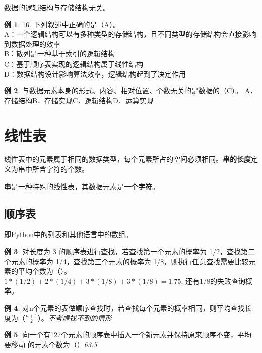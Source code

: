 \documentclass[hyperref,a4paper,UTF8,12pt]{ctexart}
\theoremstyle{definition}
\newtheorem{example}{例}[section]
\begin{document}
数据的逻辑结构与存储结构无关。
\begin{example}
    16. 下列叙述中正确的是（A）。\\
A：一个逻辑结构可以有多种类型的存储结构，且不同类型的存储结构会直接影响到数据处理的效率\\
B：散列是一种基于索引的逻辑结构\\
C：基于顺序表实现的逻辑结构属于线性结构\\
D：数据结构设计影响算法效率，逻辑结构起到了决定作用
\end{example}
\begin{example}
    与数据元素本身的形式、内容、相对位置、个数无关的是数据的（C）。
A．存储结构\quad B．存储实现\quad C．逻辑结构\quad D．运算实现
\end{example}

\section{线性表}
线性表中的元素属于相同的数据类型，每个元素所占的空间必须相同。\textbf{串的长度}定义为串中所含字符的个数。

\textbf{串}是一种特殊的线性表，其数据元素是\textbf{一个字符}。

\subsection{顺序表}
即Python中的列表和其他语言中的数组。
\begin{example}
    对长度为 3 的顺序表进行查找，若查找第一个元素的概率为 1/2，查找第二个元素的概率为 1/4，查找第三个元素的概率为 1/8，则执行任意查找需要比较元素的平均个数为（\quad）。\\
$1*(1/2) + 2*(1/4) + 3*(1/8) + 3*(1/8) = 1.75$, 还有1/8的失败查询概率。
\end{example}
\begin{example}
    对n个元素的表做顺序查找时，若查找每个元素的概率相同，则平均查找长度为（$\frac{n+1}{2}$）。\textit{不考虑找不到的情形}
\end{example}
\begin{example}
    向一个有127个元素的顺序表中插入一个新元素并保持原来顺序不变，平均要移动 的元素个数为（\quad）\quad\textit{63.5}
\end{example}
\end{document}
